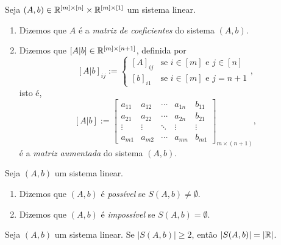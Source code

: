 \begin{definition}
    Seja $(A,b) \in \mathbb{R}^{[m] \times [n]} \times \mathbb{R}^{[m] \times [1]}$ um sistema linear.
        \begin{enumerate}[leftmargin=*, align=left, label=\textbf{(\alph*)}]
            \item Dizemos que $A$ é a \emph{matriz de coeficientes} do sistema $(A,b)$.
            \item Dizemos que $[A|b] \in \mathbb{R}^{[m] \times [n+1]}$, definida por
                \[
                    [A|b]_{ij} :=
                        \begin{cases}
                            [A]_{ij} & \text{se } i \in [m] \text{ e } j \in [n] \\
                            [b]_{i1} & \text{se } i \in [m] \text{ e } j = n+1
                        \end{cases},
                \]
            isto é,
                \[
                    [A | b] :=
                        \begin{bmatrix}
                            a_{11} & a_{12} & \cdots & a_{1n} & b_{11}\\
                            a_{21} & a_{22} & \cdots & a_{2n} & b_{21} \\
                            \vdots & \vdots & \ddots &  \vdots & \vdots \\
                            a_{m1} & a_{m2} & \cdots & a_{mn} & b_{m1}
                        \end{bmatrix}_{m \times (n+1)},
                \]
            é a \emph{matriz aumentada} do sistema $(A,b)$.
        \end{enumerate}
\end{definition}

\begin{definition}
    Seja $(A,b)$ um sistema linear.
        \begin{enumerate}[leftmargin=*, align=left, label=\textbf{(\alph*)}]
            \item Dizemos que $(A,b)$ é \emph{possível} se $S(A,b) \neq \emptyset$.
            \item Dizemos que $(A,b)$ é \emph{impossível} se $S(A,b) = \emptyset$.
        \end{enumerate}
\end{definition}

\begin{theorem}
    Seja $(A,b)$ um sistema linear. Se $|S(A,b)| \geq 2$, então $|S(A,b)| = |\mathbb{R}|$.
\end{theorem}

